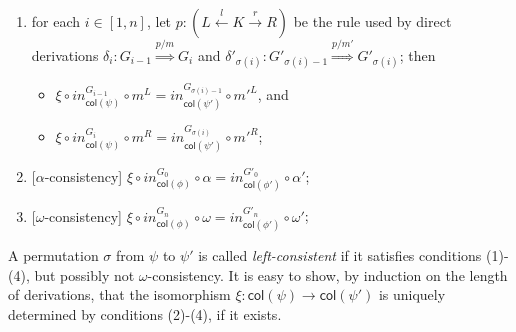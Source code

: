 \documentclass[conference]{IEEEtran}
\newcommand{\Rrel}[1]   {\stackrel{{#1}}{\Longrightarrow}}
\newcommand{\interval}[2][1]{\ensuremath{[{#1},{#2}]}}
\newcommand{\perm}{\sigma}
\newcommand{\col}[1]{\ensuremath{\mathsf{col}({#1})}}
\begin{document}
{\begin{definition}
\begin{enumerate}
\item for each $i \in \interval{n}$, let  $p : (L \stackrel{l}{\leftarrow} K \stackrel{r}{\rightarrow} R)$ be the
rule used by direct derivations $\delta_i: G_{i-1} \Rrel{p/m} G_{i}$ and
$\delta'_{\perm(i)}: G'_{\perm(i)-1} \Rrel{p/m'} G'_{\perm(i)}$; then 
\begin{itemize}
\item$\xi \circ in^{G_{i-1}}_{\col{\psi}} \circ m^L =
  in^{G_{\perm(i)-1}}_{\col{\psi'}} \circ m'^L$, and 
  \item $\xi \circ in^{G_{i}}_{\col{\psi}} \circ m^R =
  in^{G_{\perm(i)}}_{\col{\psi'}} \circ m'^R$;
\end{itemize}
  
\item {[$\alpha$-consistency]} $\xi \circ in^{G_0}_{\col{\phi}} \circ \alpha = in^{G'_0}_{\col{\phi'}} \circ \alpha'$;

\item {[$\omega$-consistency]}  $\xi \circ in^{G_n}_{\col{\phi}} \circ \omega = in^{G'_n}_{\col{\phi'}} \circ \omega'$;


%

\end{enumerate}
A permutation $\perm$ from $\psi$ to $\psi'$ is called \emph{left-consistent} if it satisfies 
conditions (1)-(4), but possibly not $\omega$-consistency.
It is easy to show, by induction on the length of derivations, that the isomorphism 
$\xi: \col{\psi} \to \col{\psi'}$ is uniquely determined by conditions (2)-(4), if it exists. 


\end{definition}}
\end{document}
